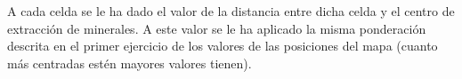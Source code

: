 A cada celda se le ha dado el valor de la distancia entre dicha celda y el centro de extracción de minerales. A este valor se 
le ha aplicado la misma ponderaci\'on descrita en el primer ejercicio de los valores de las posiciones del mapa (cuanto m\'as 
centradas est\'en mayores valores tienen).